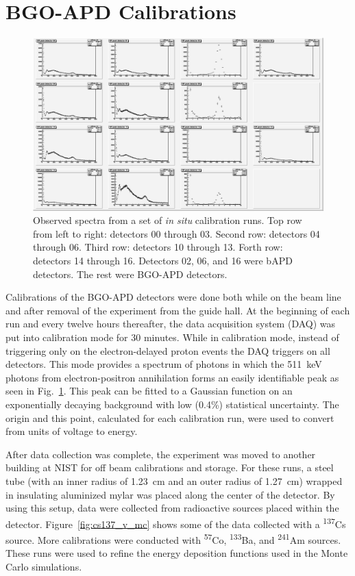 \documentclass[oneside,12pt]{memoir}
\begin{document}
\section{BGO-APD Calibrations}
\label{sec:bgo_cal}
\begin{figure}[t]
	\includegraphics[width=\textwidth]{c256offPeak.png}
	\caption[Observed spectra from a set of \emph{in situ} calibration runs.]{Observed spectra from a set of \emph{in situ} calibration runs. Top row from left to right: detectors 00 through 03. Second row: detectors 04 through 06. Third row: detectors 10 through 13. Forth row: detectors 14 through 16. Detectors 02, 06, and 16 were bAPD detectors. The rest were BGO-APD detectors.}
	\label{fig:calspec}
\end{figure}
Calibrations of the BGO-APD detectors were done both while on the beam line and after removal of the experiment from the guide hall. At the beginning of each run and every twelve hours thereafter, the data acquisition system (DAQ) was put into calibration mode for 30 minutes. While in calibration mode, instead of triggering only on the electron-delayed proton events the DAQ triggers on all detectors. This mode provides a spectrum of photons in which the 511~keV photons from electron-positron annihilation forms an easily identifiable peak as seen in Fig.~\ref{fig:calspec}. This peak can be fitted to a Gaussian function on an exponentially decaying background with low (0.4\%) statistical uncertainty. The origin and this point, calculated for each calibration run, were used to convert from units of voltage to energy.\par
After data collection was complete, the experiment was moved to another building at NIST for off beam calibrations and storage. For these runs, a steel tube (with an inner radius of 1.23~cm and an outer radius of 1.27~cm) wrapped in insulating aluminized mylar was placed along the center of the detector. By using this setup, data were collected from radioactive sources placed within the detector. Figure~\ref{fig:cs137_v_mc} shows some of the data collected with a \textsuperscript{137}Cs source. More calibrations were conducted with \textsuperscript{57}Co, \textsuperscript{133}Ba, and \textsuperscript{241}Am sources. These runs were used to refine the energy deposition functions used in the Monte Carlo simulations.\par
\end{document}
